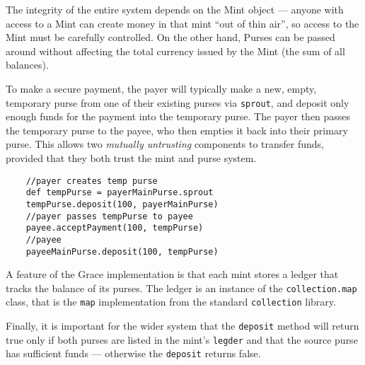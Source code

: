 The integrity of the entire system depends on the Mint object ---
anyone with access to a Mint can create money in that mint ``out of
thin air'', so access to the Mint must be carefully controlled.  On
the other hand, Purses can be passed around without affecting the
total currency issued by the Mint (the sum of all balances).

To make a secure payment, the payer will typically make a new, empty,
temporary purse from one of their existing purses via
\lstinline+sprout+, and deposit only enough funds for the payment into
the temporary purse.  The payer then passes the temporary purse to the
payee, who then empties it back into their primary purse.  This allows
two \textit{mutually untrusting} components to transfer funds,
provided that they both trust the mint and purse system.  

\label{s-payment}
\begin{lstlisting}
    //payer creates temp purse
    def tempPurse = payerMainPurse.sprout
    tempPurse.deposit(100, payerMainPurse)
    //payer passes tempPurse to payee
    payee.acceptPayment(100, tempPurse)
    //payee
    payeeMainPurse.deposit(100, tempPurse)
\end{lstlisting}

A feature of the Grace implementation is that each mint stores a
ledger that tracks the balance of its purses.
The ledger is an instance of the \lstinline+collection.map+ class, that is
the \lstinline+map+ implementation from the standard
\lstinline+collection+ library.

Finally, it is important for the wider system that the
\lstinline+deposit+ method will return true only if both purses
are listed in the mint's \lstinline+legder+ and that the source purse
has sufficient funds --- otherwise the \lstinline+deposit+ returns false.

